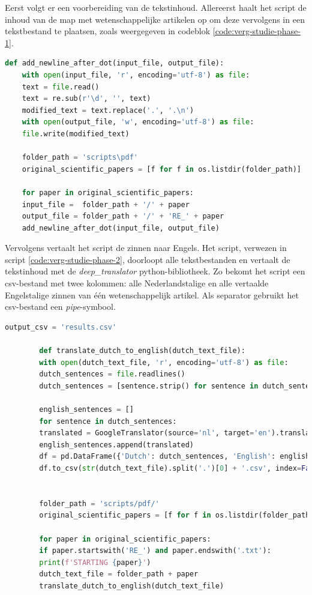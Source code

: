 \medspace

Eerst volgt er een voorbereiding van de tekstinhoud. Allereerst haalt het script de inhoud van de map met wetenschappelijke artikelen op om deze vervolgens in een tekstbestand te plaatsen, zoals weergegeven in codeblok \ref{code:verg-studie-phase-1}. 

\begin{lstlisting}[language=Python, caption={Script voor fase 1 van de vergelijkende studie.}, label={code:verg-studie-phase-1}]
	def add_newline_after_dot(input_file, output_file):
	with open(input_file, 'r', encoding='utf-8') as file:
	text = file.read()
	text = re.sub(r'\d', '', text)
	modified_text = text.replace('.', '.\n')
	with open(output_file, 'w', encoding='utf-8') as file:
	file.write(modified_text)
	
	folder_path = 'scripts\pdf'
	original_scientific_papers = [f for f in os.listdir(folder_path)]
	
	for paper in original_scientific_papers:
	input_file =  folder_path + '/' + paper
	output_file = folder_path + '/' + 'RE_' + paper
	add_newline_after_dot(input_file, output_file)
\end{lstlisting} 

Vervolgens vertaalt het script de zinnen naar Engels. Het script, verwezen in script \ref{code:verg-studie-phase-2}, doorloopt alle tekstbestanden en vertaalt de tekstinhoud met de \textit{deep\_translator} python-bibliotheek. Zo bekomt het script een csv-bestand met twee kolommen: alle Nederlandstalige en alle vertaalde Engelstalige zinnen van één wetenschappelijk artikel. Als separator gebruikt het csv-bestand een \textit{pipe}-symbool.

\begin{center}
	\begin{lstlisting}[language=Python, caption={Script voor de tweede fase van de vergelijkende studie.}, label={code:verg-studie-phase-2}]
		output_csv = 'results.csv'
		
		def translate_dutch_to_english(dutch_text_file):
		with open(dutch_text_file, 'r', encoding='utf-8') as file:
		dutch_sentences = file.readlines()
		dutch_sentences = [sentence.strip() for sentence in dutch_sentences]
		
		english_sentences = []
		for sentence in dutch_sentences:
		translated = GoogleTranslator(source='nl', target='en').translate(sentence)
		english_sentences.append(translated)
		df = pd.DataFrame({'Dutch': dutch_sentences, 'English': english_sentences})
		df.to_csv(str(dutch_text_file).split('.')[0] + '.csv', index=False)
		
		
		folder_path = 'scripts/pdf/'
		original_scientific_papers = [f for f in os.listdir(folder_path)]
		
		for paper in original_scientific_papers:
		if paper.startswith('RE_') and paper.endswith('.txt'):
		print(f'STARTING {paper}')
		dutch_text_file = folder_path + paper
		translate_dutch_to_english(dutch_text_file)
	\end{lstlisting}
\end{center}


